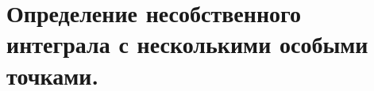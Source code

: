 \documentclass[../main.tex]{subfiles}
\begin{document}
\newpage
\section{Определение несобственного интеграла с несколькими особыми точками.}
\end{document}
